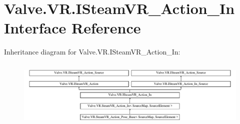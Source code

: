 \hypertarget{interface_valve_1_1_v_r_1_1_i_steam_v_r___action___in}{}\section{Valve.\+V\+R.\+I\+Steam\+V\+R\+\_\+\+Action\+\_\+\+In Interface Reference}
\label{interface_valve_1_1_v_r_1_1_i_steam_v_r___action___in}
Inheritance diagram for Valve.\+V\+R.\+I\+Steam\+V\+R\+\_\+\+Action\+\_\+\+In\+:\begin{figure}[H]
\begin{center}
\leavevmode
\includegraphics[height=3.286385cm]{interface_valve_1_1_v_r_1_1_i_steam_v_r___action___in}
\end{center}
\end{figure}

